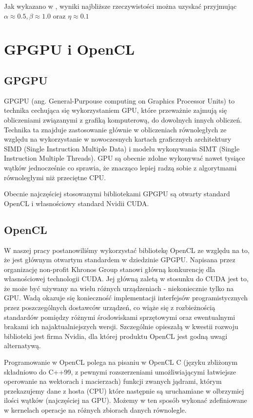 \documentclass[polish, 12pt]{aghthesis}
\begin{document}
			Jak wykazano w \cite{Lombardi}, wyniki najbliższe rzeczywistości można uzyskać przyjmując $\alpha \approx 0.5, \beta \approx 1.0$ oraz $\eta \approx 0.1$
	
	\section{GPGPU i OpenCL}
		
		\subsection{GPGPU}
			GPGPU (ang. General-Purpouse computing on Graphics Processor Units) to technika cechująca się wykorzystaniem GPU, które przeważnie zajmują się obliczeniami związanymi z grafiką komputerową, do dowolnych innych obliczeń. Technika ta znajduje zastosowanie głównie w obliczeniach równoległych ze względu na wykorzystanie w nowoczesnych kartach graficznych architektury SIMD (Single Instruction Multiple Data) i modelu wykonywania SIMT (Single Instruction Multiple Threads). GPU są obecnie zdolne wykonywać nawet tysiące wątków jednocześnie co sprawia, że znacząco lepiej radzą sobie z algorytmami równoległymi niż przeciętne CPU. 
			

			Obecnie najczęściej stosowanymi bibliotekami GPGPU są otwarty standard OpenCL i własnościowy standard Nvidii CUDA.
		
		\subsection{OpenCL}
			W naszej pracy postanowiliśmy wykorzystać bibliotekę OpenCL ze względu na to, że jest głównym otwartym standardem w dziedzinie GPGPU. Napisana przez organizację non-profit Khronos Group stanowi główną konkurencję dla własnościowej technologii CUDA. Jej główną zaletą w stosunku do CUDA jest to, że może być używany na wielu różnych urządzeniach - niekoniecznie tylko na GPU. Wadą okazuje się konieczność implementacji interfejsów programistycznych przez poszczególnych dostawców urządzeń, co wiąże się z rozbieżnością standardów pomiędzy różnymi środowiskami sprzętowymi oraz ewentualnymi brakami ich najaktualniejszych wersji. Szczególnie opieszałą w kwestii rozwoju biblioteki jest firma Nvidia, dla której produktu OpenCL jest godną uwagi alternatywą.	

			Programowanie w OpenCL polega na pisaniu w OpenCL C (języku zbliżonym składniowo do C++99, z pewnymi rozszerzeniami umożliwiającymi łatwiejsze operowanie na wektorach i macierzach) funkcji zwanych jądrami, którym przekazujemy dane z hosta (CPU) które następnie są uruchamiane w olbrzymiej ilości wątków (najczęściej na GPU). Możemy w ten sposób wykonać zdefiniowane w kernelach operacje na różnych zbiorach danych równolegle. 
			
\end{document}

